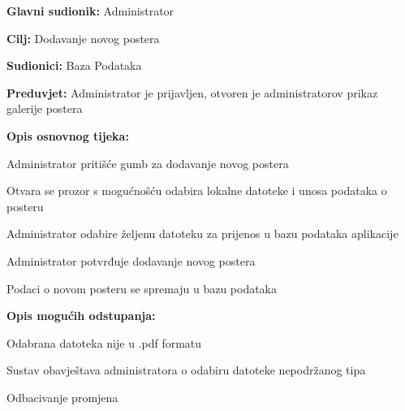 					\noindent {}
					\begin{packed_item}
						
						\item \textbf{Glavni sudionik: } Administrator
						\item  \textbf{Cilj:} Dodavanje novog postera
						\item  \textbf{Sudionici:} Baza Podataka
						\item  \textbf{Preduvjet:} Administrator je prijavljen, otvoren je administratorov prikaz galerije postera
						\item  \textbf{Opis osnovnog tijeka:}
						
						\item[] \begin{packed_enum}
							
							\item Administrator pritišće gumb za dodavanje novog postera
							\item Otvara se prozor s mogućnošću odabira lokalne datoteke i unosa podataka o posteru
							\item Administrator odabire željenu datoteku za prijenos u bazu podataka aplikacije
							\item Administrator potvrđuje dodavanje novog postera
							\item Podaci o novom posteru se spremaju u bazu podataka
							
						\end{packed_enum}
						
						\item  \textbf{Opis mogućih odstupanja:}
						
						\item[] \begin{packed_item}
							
							\item[3.a] Odabrana datoteka nije u .pdf formatu
							\item[] \begin{packed_enum}
								
								\item Sustav obavještava administratora o odabiru datoteke nepodržanog tipa
								\item Odbacivanje promjena
								
							\end{packed_enum}			
						\end{packed_item}
					\end{packed_item}
					
